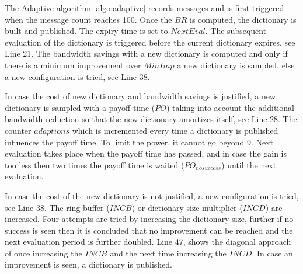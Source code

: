 


The Adaptive algorithm \ref{algo:adaptive} records messages and is first triggered when the message count reaches 100. Once the $BR$ is computed, the dictionary is built and published. The expiry time is set to $NextEval$. The subsequent evaluation of the dictionary is triggered before the current dictionary expires, see Line 21. The bandwidth savings with a new dictionary is computed and only if there is a minimum improvement over $MinImp$ a new dictionary is sampled, else a new configuration is tried, see Line 38.

In case the cost of new dictionary and bandwidth savings is justified, a new dictionary is sampled with a payoff time ($PO$) taking into account the additional bandwidth reduction so that the new dictionary amortizes itself, see Line 28. The counter $adaptions$ which is incremented every time a dictionary is published influences the payoff time. To limit the power, it cannot go beyond 9. Next evaluation takes place when the payoff time has passed, and in case the gain is too less then two times the payoff time is waited ($PO_{nosuccess}$) until the next evaluation. 

In case the cost of the new dictionary is not justified, a new configuration is tried, see Line 38. The ring buffer ($INCB$) or dictionary size multiplier ($INCD$) are increased. Four attempts are tried by increasing the dictionary size, further if no success is seen then it is concluded that no improvement can be reached and the next evaluation period is further doubled. Line 47, shows the diagonal approach of once increasing the $INCB$ and the next time increasing the $INCD$. In case an improvement is seen, a dictionary is published.  

